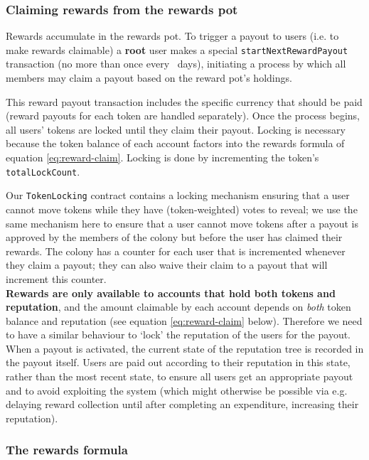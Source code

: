 \subsubsection{Claiming rewards from the rewards pot}\label{sec:claimrewards}

Rewards accumulate in the rewards pot. To trigger a payout to users (i.e. to make rewards claimable) a \textbf{root} user makes a special \texttt{startNextRewardPayout} transaction (no more than once every \rewardclaimduration\ days), initiating a process by which all members may claim a payout based on the reward pot's holdings.

This reward payout transaction includes the specific currency that should be paid (reward payouts for each token are handled separately). Once the process begins, all users' tokens are locked until they claim their payout. Locking is necessary because the token balance of each account factors into the rewards formula of equation \eqref{eq:reward-claim}. Locking is done by incrementing the token's \texttt{totalLockCount}.

Our \texttt{TokenLocking} contract contains a locking mechanism ensuring that a user cannot move tokens while they have (token-weighted) votes to reveal; we use the same mechanism here to ensure that a user cannot move tokens after a payout is approved by the members of the colony but before the user has claimed their rewards. The colony has a counter for each user that is incremented whenever they claim a payout; they can also waive their claim to a payout that will increment this counter. \\

\textbf{Rewards are only available to accounts that hold both tokens and reputation}, and the amount claimable by each account depends on \emph{both} token balance and reputation (see equation \eqref{eq:reward-claim} below). Therefore we need to have a similar behaviour to `lock' the reputation of the users for the payout. When a payout is activated, the current state of the reputation tree is recorded in the payout itself. Users are paid out according to their reputation in this state, rather than the most recent state, to ensure all users get an appropriate payout and to avoid exploiting the system (which might otherwise be possible via e.g. delaying reward collection until after completing an expenditure, increasing their reputation).

\subsubsection{The rewards formula}

